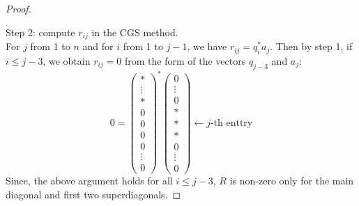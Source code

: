 \documentclass{article}
\numberwithin{pic}{section}
\numberwithin{lem}{section}
\numberwithin{thm}{section}
\numberwithin{cor}{section}
\theoremstyle{definition}
\numberwithin{ex}{section}
\numberwithin{defn}{section}
\theoremstyle{definition}
\theoremstyle{remark}
\begin{document}
\begin{proof}
\begin{description}
\end{description}
Step 2: compute $r_{ij}$ in the CGS method.\\
For $j$ from 1 to $n$ and for $i$ from 1 to $j-1$, we have $r_{ij}= q_i^*a_j$.
Then by step 1, if $i\leq j-3$, we obtain $r_{ij}=0$ from the form of the vectors $q_{j-3}$ and $a_j$:
\[0=\begin{pmatrix}
* \\ 
\vdots  \\ 
* \\ 
0 \\ 
0 \\
0\\
0 \\
\vdots \\ 
0
\end{pmatrix}^*\begin{pmatrix}
0 \\ 
\vdots  \\ 
0 \\ 
* \\ 
* \\ 
*\\
0\\
\vdots\\
0
\end{pmatrix} \leftarrow j\text{-th enttry} \]
Since, the above argument holds for all $i\leq j-3$, $R$ is non-zero only for the main diagonal and first two superdiagonals.
\end{proof}
\end{document}
